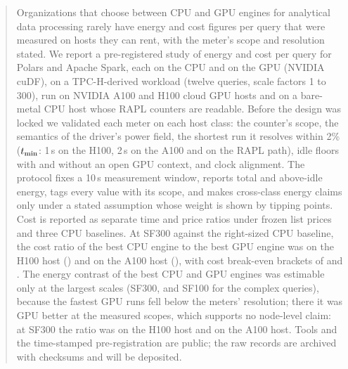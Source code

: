 \documentclass[sigconf]{acmart}
\begin{document}
\begin{abstract}
Organizations that choose between CPU and GPU engines for analytical data processing rarely
have energy and cost figures per query that were measured on hosts they can rent, with the
meter's scope and resolution stated. We report a pre-registered study of energy and cost per
query for Polars and Apache Spark, each on the CPU and on the GPU (NVIDIA cuDF), on a
TPC-H-derived workload (twelve queries, scale factors 1 to 300), run on NVIDIA A100 and H100
cloud GPU hosts and on a bare-metal CPU host whose RAPL counters are readable. Before the
design was locked we validated each meter on each host class: the counter's scope, the
semantics of the driver's power field, the shortest run it resolves within 2\% ($\tmin$: 1\,s
on the H100, 2\,s on the A100 and on the RAPL path), idle floors with and without an open GPU
context, and clock alignment. The protocol fixes a 10\,s measurement window, reports total and
above-idle energy, tags every value with its scope, and makes cross-class energy claims only
under a stated assumption whose weight is shown by tipping points. Cost is reported as
separate time and price ratios under frozen list prices and three CPU baselines.
At SF300 against the right-sized CPU baseline, the cost ratio of the best CPU engine to the best GPU
engine was
 on the H100 host ()
and  on the A100 host (),
with cost break-even brackets of  and
. The energy contrast of the best CPU and GPU engines was
estimable only at the largest scales (SF300, and SF100 for the complex queries), because the fastest GPU
runs fell below the meters' resolution; there it was GPU better at the measured scopes, which supports no
node-level claim: at SF300 the ratio was  on the H100 host and
 on the A100 host.
Tools and the time-stamped pre-registration are public; the raw records are archived with checksums and
will be deposited.
\end{abstract}
\end{document}
